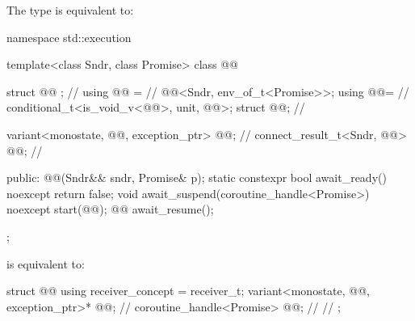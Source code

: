 \pnum
The type  is equivalent to:

\begin{codeblock}
namespace std::execution {
  template<class Sndr, class Promise>
  class @@ {
    struct @@ {};                                             // \expos
    using @@ =                                          // \expos
      @@<Sndr, env_of_t<Promise>>;
    using @@=                                         // \expos
      conditional_t<is_void_v<@@>, unit, @@>;
    struct @@;                                  // \expos

    variant<monostate, @@, exception_ptr> @@{};    // \expos
    connect_result_t<Sndr, @@> @@;           // \expos

  public:
    @@(Sndr&& sndr, Promise& p);
    static constexpr bool await_ready() noexcept { return false; }
    void await_suspend(coroutine_handle<Promise>) noexcept { start(@@); }
    @@ await_resume();
  };
}
\end{codeblock}

\pnum
{} is equivalent to:
\begin{codeblock}
struct @@ {
  using receiver_concept = receiver_t;
  variant<monostate, @@, exception_ptr>* @@;   // \expos
  coroutine_handle<Promise> @@;                       // \expos
  // \seebelow
};
\end{codeblock}

